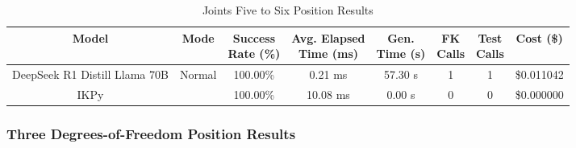 \begin{table}[H]
\tiny
\renewcommand{\arraystretch}{1.2}
\caption{Joints Five to Six Position Results}
\begin{center}
\begin{tabular}{|c|c|c|c|c|c|c|c|}
    \hline
    \textbf{Model} & 
    \textbf{Mode} & 
    \makecell{\textbf{Success}\\\textbf{Rate (\%)}} &
    \makecell{\textbf{Avg. Elapsed}\\\textbf{Time (ms)}} &
    \makecell{\textbf{Gen.}\\\textbf{Time (s)}} &
    \makecell{\textbf{FK}\\\textbf{Calls}} &
    \makecell{\textbf{Test}\\\textbf{Calls}} &
    \textbf{Cost (\$)} \\
    \hline
    DeepSeek R1 Distill Llama 70B & Normal & 100.00\% & 0.21 ms & 57.30 s & 1 & 1 & \$0.011042 \\
    \hline
    IKPy &  & 100.00\% & 10.08 ms & 0.00 s & 0 & 0 & \$0.000000 \\
    \hline
\end{tabular}
\label{Results-Position-5-6}
\end{center}
\end{table}

\subsubsection{Three Degrees-of-Freedom Position Results}

